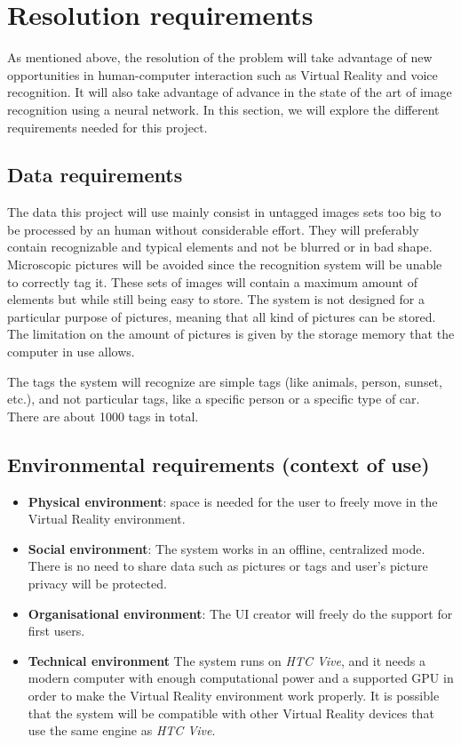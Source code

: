 \documentclass[11pt,a4paper]{article}
\begin{document}
\section{Resolution requirements}

As mentioned above, the resolution of the problem will take advantage of new opportunities in human-computer interaction such as Virtual Reality and voice recognition. It will also take advantage of advance in the state of the art of image recognition using a neural network. In this section, we will explore the different requirements needed for this project.

\subsection{Data requirements}

The data this project will use mainly consist in untagged images sets too big to be processed by an human without considerable effort. They will preferably contain recognizable  and typical elements and not be blurred or in bad shape. Microscopic pictures will be avoided since the recognition system will be unable to correctly tag it. These sets of images will contain a maximum amount of elements but while still being easy to store. 
The system is not designed for a particular purpose of pictures, meaning that all kind of pictures can be stored. The limitation on the amount of pictures is given by the storage memory that the computer in use allows.

The tags the system will recognize are simple tags (like animals, person, sunset, etc.), and not particular tags, like a specific person or a specific type of car. There are about 1000 tags in total.

\subsection{Environmental requirements (context of use)}

\begin{itemize}
\item \textbf{Physical environment}: space is needed for the user to freely move in the Virtual Reality environment.
\item \textbf{Social environment}: The system works in an offline, centralized mode. There is no need to share data such as pictures or tags and user's picture privacy will be protected.
\item \textbf{Organisational environment}: The UI creator will freely do the support for first users.
\item \textbf{Technical environment}
The system runs on \textit{HTC Vive}, and it needs a modern computer with enough computational power and a supported GPU in order to make the Virtual Reality environment work properly. 
It is possible that the system will be compatible with other Virtual Reality devices that use the same engine as \textit{HTC Vive}.
\end{itemize}
\end{document}
